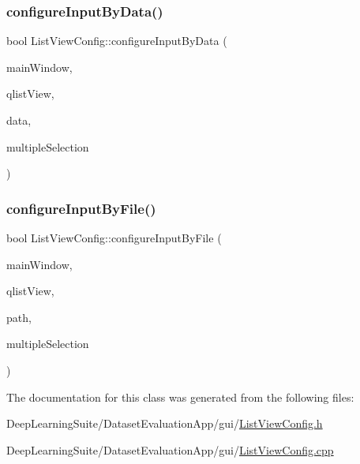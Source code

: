 \mbox{\label{class_list_view_config_a4e5262ada7f3ae203f6ad7b86998def7}} 
\subsubsection{\texorpdfstring{configure\+Input\+By\+Data()}{configureInputByData()}}
{\footnotesize\ttfamily bool List\+View\+Config\+::configure\+Input\+By\+Data (\begin{DoxyParamCaption}\item[{Q\+Main\+Window $\ast$}]{main\+Window,  }\item[{Q\+List\+View $\ast$}]{qlist\+View,  }\item[{const std\+::vector$<$ std\+::string $>$ \&}]{data,  }\item[{bool}]{multiple\+Selection }\end{DoxyParamCaption})\hspace{0.3cm}{\ttfamily [static]}}

\mbox{\label{class_list_view_config_aa280ece932674550644df1b827f768b0}} 
\subsubsection{\texorpdfstring{configure\+Input\+By\+File()}{configureInputByFile()}}
{\footnotesize\ttfamily bool List\+View\+Config\+::configure\+Input\+By\+File (\begin{DoxyParamCaption}\item[{Q\+Main\+Window $\ast$}]{main\+Window,  }\item[{Q\+List\+View $\ast$}]{qlist\+View,  }\item[{const std\+::string \&}]{path,  }\item[{bool}]{multiple\+Selection }\end{DoxyParamCaption})\hspace{0.3cm}{\ttfamily [static]}}



The documentation for this class was generated from the following files\+:\begin{DoxyCompactItemize}
\item 
Deep\+Learning\+Suite/\+Dataset\+Evaluation\+App/gui/\hyperlink{_list_view_config_8h}{List\+View\+Config.\+h}\item 
Deep\+Learning\+Suite/\+Dataset\+Evaluation\+App/gui/\hyperlink{_list_view_config_8cpp}{List\+View\+Config.\+cpp}\end{DoxyCompactItemize}
